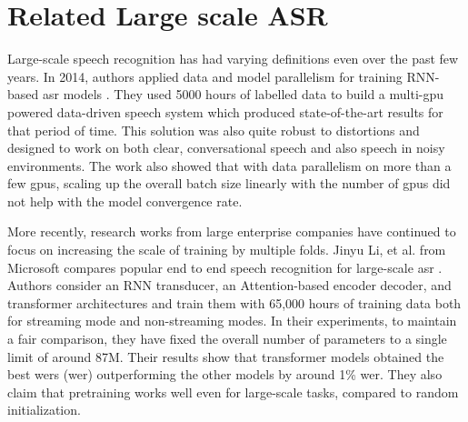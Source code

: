 \section{Related Large scale ASR}
\label{section:largescale_related}
Large-scale speech recognition has had varying definitions even over the past few years. In 2014, authors applied data and model parallelism for training RNN-based \acrshort{asr} models \cite{Hannun2014DeepRecognition}. They used 5000 hours of labelled data to build a multi-\acrshort{gpu} powered data-driven speech system which produced state-of-the-art results for that period of time. This solution was also quite robust to distortions and designed to work on both clear, conversational speech and also speech in noisy environments. The work also showed that with data parallelism on more than a few \acrshort{gpu}s, scaling up the overall batch size linearly with the number of \acrshort{gpu}s did not help with the model convergence rate.

More recently, research works from large enterprise companies have continued to focus on increasing the scale of training by multiple folds. Jinyu Li, et al. from Microsoft compares popular end to end speech recognition for large-scale \acrshort{asr} \cite{Li2020OnRecognition}. Authors consider an RNN transducer, an Attention-based encoder decoder, and transformer architectures and train them with 65,000 hours of training data both for streaming mode and non-streaming modes. In their experiments, to maintain a fair comparison, they have fixed the overall number of parameters to a single limit of around 87M. Their results show that transformer models obtained the best \acrlong{wer}s (\acrshort{wer}) outperforming the other models by around 1\% \acrshort{wer}. They also claim that pretraining works well even for large-scale tasks, compared to random initialization.


